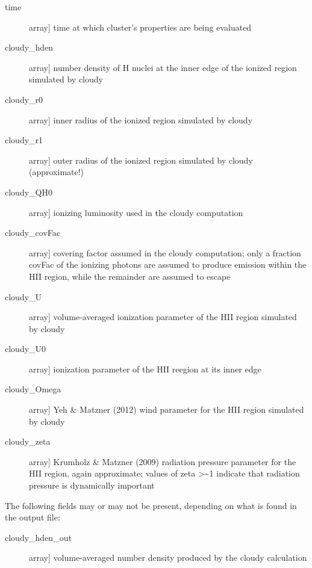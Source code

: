 \documentclass[letterpaper,10pt,english]{sphinxmanual}
\begin{document}
\begin{fulllineitems}
\begin{description}
\begin{description}
\item[{time}] \leavevmode{[}array{]}
time at which cluster's properties are being evaluated

\item[{cloudy\_hden}] \leavevmode{[}array{]}
number density of H nuclei at the inner edge of the ionized
region simulated by cloudy

\item[{cloudy\_r0}] \leavevmode{[}array{]}
inner radius of the ionized region simulated by cloudy

\item[{cloudy\_r1}] \leavevmode{[}array{]}
outer radius of the ionized region simulated by cloudy (approximate!)

\item[{cloudy\_QH0}] \leavevmode{[}array{]}
ionizing luminosity used in the cloudy computation

\item[{cloudy\_covFac}] \leavevmode{[}array{]}
covering factor assumed in the cloudy computation; only a
fraction covFac of the ionizing photons are assumed to
produce emission within the HII region, while the remainder
are assumed to escape

\item[{cloudy\_U}] \leavevmode{[}array{]}
volume-averaged ionization parameter of the HII region
simulated by cloudy

\item[{cloudy\_U0}] \leavevmode{[}array{]}
ionization parameter of the HII reegion at its inner edge

\item[{cloudy\_Omega}] \leavevmode{[}array{]}
Yeh \& Matzner (2012) wind parameter for the HII region
simulated by cloudy

\item[{cloudy\_zeta}] \leavevmode{[}array{]}
Krumholz \& Matzner (2009) radiation pressure parameter for
the HII region, again approximate; values of zeta \textgreater{}\textasciitilde{}1
indicate that radiation pressure is dynamically important

\end{description}

The following fields may or may not be present, depending on
what is found in the output file:
\begin{description}
\item[{cloudy\_hden\_out}] \leavevmode{[}array{]}
volume-averaged number density produced by the cloudy
calculation


\end{description}
\end{description}
\end{fulllineitems}
\end{document}
